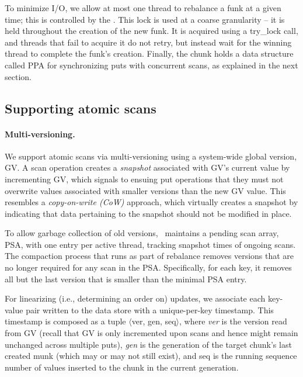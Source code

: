 To minimize I/O, we allow at most one thread to rebalance a funk at a given time; this is controlled by 
the  . 
This lock is used at a coarse granularity -- it is held throughout the creation of the new funk. 
It is acquired using a try\_lock call, and threads that fail to acquire it do not retry, but instead wait for the winning thread 
to complete the funk's creation.
Finally, the chunk holds a data structure called PPA for synchronizing  puts with concurrent scans, as explained in the next section. 




\subsection{Supporting atomic scans}
\label{ssec:scans}


\paragraph{Multi-versioning.}

We support atomic scans via multi-versioning using a system-wide global version, GV. 
A scan operation creates a \emph{snapshot} associated with GV's current value by incrementing GV, 
which signals to ensuing put operations that they must not overwrite values associated with 
smaller versions than the new GV value.
This resembles a \emph{copy-on-write (CoW)} approach, which virtually creates a snapshot by 
indicating that data pertaining to the snapshot should not be modified in place.  

To allow garbage collection of old versions, \sys\  maintains 
a pending scan array, PSA, with one entry per active thread, tracking snapshot times of ongoing scans.
The compaction process that runs as part of rebalance removes versions that are no longer required for any  
scan in the PSA. Specifically, for each key, it removes all but the last version that is smaller than the minimal
PSA entry. 

For linearizing (i.e., determining an order on) updates, we associate each key-value pair written to the data store 
with a unique-per-key timestamp.
This timestamp is composed as a tuple $\langle$ver, gen, seq$\rangle$, where \emph{ver} is  the version read from GV 
(recall that GV is only incremented upon scans and hence might remain unchanged across multiple puts),
\emph{gen} is the generation of the target chunk's last created munk  (which may or may not still exist), 
and seq is the running sequence number of values inserted to the chunk in the current generation.

